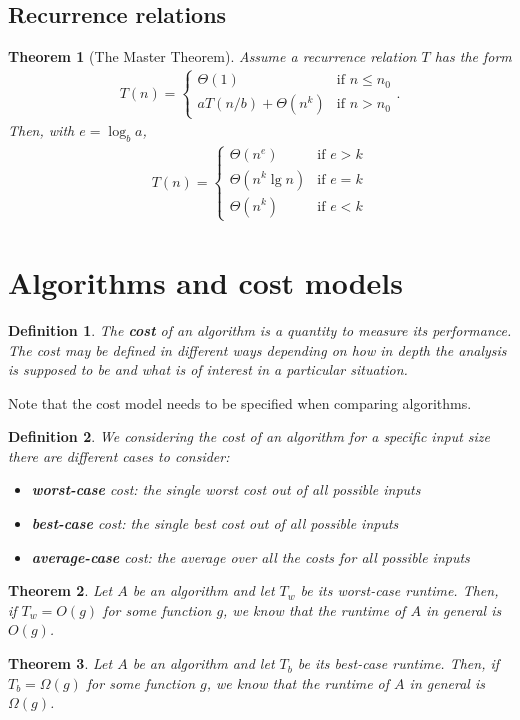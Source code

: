 \documentclass{article}
\theoremstyle{sltheorem}
\newtheorem{definition}{Definition}[section]
\newtheorem{theorem}{Theorem}[section]
\newcommand*\B[1]{\textbf{#1}}
\begin{document}
\subsection{Recurrence relations}
\begin{theorem}[The Master Theorem]
	Assume a recurrence relation $T$ has the form
	\begin{align*}
		T(n) = \begin{cases}
			\Theta(1) &\text{if $n\leq n_0$}\\
			aT(n/b) + \Theta(n^k) &\text{if $n>n_0$}
		\end{cases}.
	\end{align*}
	Then, with $e=\log_b a$, 
	\begin{align*}
		T(n) = \begin{cases}
			\Theta(n^e) &\text{if $e>k$}\\
			\Theta(n^k\lg n) &\text{if $e=k$}\\
			\Theta(n^k) &\text{if $e<k$}
		\end{cases}
	\end{align*}
\end{theorem}
\section{Algorithms and cost models}
\begin{definition}
	The \B{cost} of an algorithm is a quantity to measure its performance.\\
	The cost may be defined in different ways depending on
	how in depth the analysis is supposed to be and what
	is of interest in a particular situation.
\end{definition}
Note that the cost model needs to be specified when comparing algorithms.
\begin{definition}
	We considering the cost of an algorithm for a specific input size there are different cases to consider:
	\begin{itemize}
		\item \B{worst-case} cost: the single worst cost out of all possible inputs
		\item \B{best-case} cost: the single best cost out of all possible inputs
		\item \B{average-case} cost: the average over all the costs for all possible inputs
	\end{itemize}
\end{definition}
\begin{theorem}
	Let $A$ be an algorithm and let $T_w$ be its worst-case runtime. Then, if $T_w=O(g)$ for some function $g$,
	we know that the runtime of $A$ \emph{in general} is $O(g)$.
\end{theorem}
\begin{theorem}
	Let $A$ be an algorithm and let $T_b$ be its best-case runtime. Then, if $T_b=\Omega(g)$ for some function $g$,
	we know that the runtime of $A$ \emph{in general} is $\Omega (g)$.
\end{theorem}
\end{document}
